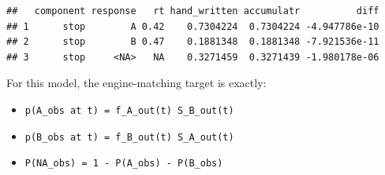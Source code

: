 \documentclass[
]{article}
\newenvironment{Shaded}{\begin{snugshade}}{\end{snugshade}}
\newcommand{\NormalTok}[1]{#1}
\newcommand{\OtherTok}[1]{\textcolor[rgb]{0.56,0.35,0.01}{#1}}
\newcommand{\SpecialCharTok}[1]{\textcolor[rgb]{0.81,0.36,0.00}{\textbf{#1}}}
\providecommand{\tightlist}{%
  \setlength{\itemsep}{0pt}\setlength{\parskip}{0pt}}
\begin{document}
\begin{Shaded}
\end{Shaded}

\begin{verbatim}
##   component response   rt hand_written accumulatr          diff
## 1      stop        A 0.42    0.7304224  0.7304224 -4.947786e-10
## 2      stop        B 0.47    0.1881348  0.1881348 -7.921536e-11
## 3      stop     <NA>   NA    0.3271459  0.3271439 -1.980178e-06
\end{verbatim}

For this model, the engine-matching target is exactly:

\begin{itemize}
\tightlist
\item
  \texttt{p(A\_obs\ at\ t)\ =\ f\_A\_out(t)\ S\_B\_out(t)}
\item
  \texttt{p(B\_obs\ at\ t)\ =\ f\_B\_out(t)\ S\_A\_out(t)}
\item
  \texttt{P(NA\_obs)\ =\ 1\ -\ P(A\_obs)\ -\ P(B\_obs)}
\end{itemize}
\end{document}
